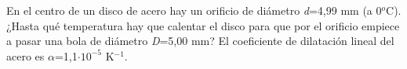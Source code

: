 
En el centro de un disco de acero hay un orificio de diámetro \textit{d}=4,99 mm (a 0$^o$C). ¿Hasta qué temperatura hay que calentar el disco para que por el orificio empiece a pasar una bola de diámetro \textit{D}=5,00 mm? El coeficiente de dilatación lineal del acero es $\alpha$=1,1$\cdot 10^{-5}$ K$^{-1}$.